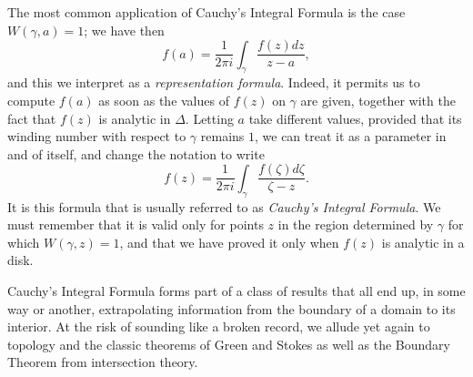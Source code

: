The most common application of Cauchy's Integral Formula is the case $W(\gamma, a)=1$; we have then $$f(a)=\dfrac{1}{2\pi i}\int_{\gamma} \dfrac{f(z)dz}{z-a},$$ and this we interpret as a \emph{representation formula}. Indeed, it permits us to compute $f(a)$ as soon as the values of $f(z)$ on $\gamma$ are given, together with the fact that $f(z)$ is analytic in $\Delta$. Letting $a$ take different values, provided that its winding number with respect to $\gamma$ remains $1$, we can treat it as a parameter in and of itself, and change the notation to write
\begin{equation}
\label{eq:representation-formula}
f(z)=\dfrac{1}{2\pi i}\int_{\gamma} \dfrac{f(\zeta)d\zeta}{\zeta-z}.
\end{equation} It is this formula that is usually referred to as \emph{Cauchy's Integral Formula}. We must remember that it is valid only for points $z$ in the region determined by $\gamma$ for which $W(\gamma, z)=1$, and that we have proved it only when $f(z)$ is analytic in a disk.

Cauchy's Integral Formula forms part of a class of results that all end up, in some way or another, extrapolating information from the boundary of a domain to its interior. At the risk of sounding like a broken record, we allude yet again to topology and the classic theorems of Green and Stokes as well as the Boundary Theorem from intersection theory.

